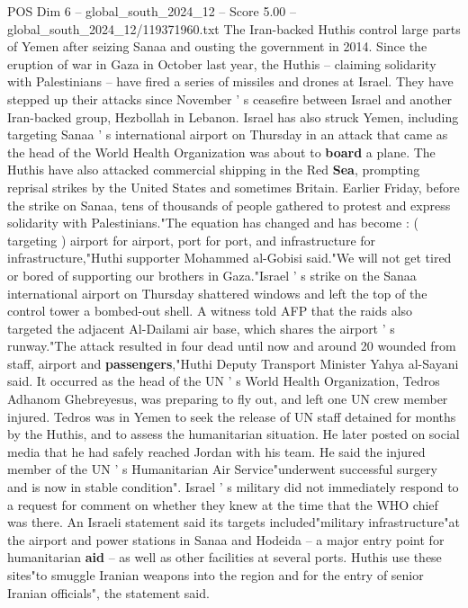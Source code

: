 \begin{textsample}{POS Dim 6 – global\_south\_2024\_12 – Score 5.00 – global\_south\_2024\_12/119371960.txt}  \label{ex:f6_pos_321}
The Iran-backed Huthis control large parts of Yemen after seizing Sanaa and ousting the government in 2014.
Since the eruption of war in Gaza in October last year, the Huthis -- claiming solidarity with Palestinians -- have fired a series of missiles and drones at Israel.
They have stepped up their attacks since November ' s ceasefire between Israel and another Iran-backed group, Hezbollah in Lebanon.
Israel has also struck Yemen, including targeting Sanaa ' s international airport on Thursday in an attack that came as the head of the World Health Organization was about to \textbf{board} a plane.
The Huthis have also attacked commercial shipping in the Red \textbf{Sea}, prompting reprisal strikes by the United States and sometimes Britain.
Earlier Friday, before the strike on Sanaa, tens of thousands of people gathered to protest and express solidarity with Palestinians."The equation has changed and has become : ( targeting ) airport for airport, port for port, and infrastructure for infrastructure,"Huthi supporter Mohammed al-Gobisi said."We will not get tired or bored of supporting our brothers in Gaza."Israel ' s strike on the Sanaa international airport on Thursday shattered windows and left the top of the control tower a bombed-out shell.
A witness told AFP that the raids also targeted the adjacent Al-Dailami air base, which shares the airport ' s runway."The attack resulted in four dead until now and around 20 wounded from staff, airport and \textbf{passengers},"Huthi Deputy Transport Minister Yahya al-Sayani said.
It occurred as the head of the UN ' s World Health Organization, Tedros Adhanom Ghebreyesus, was preparing to fly out, and left one UN crew member injured.
Tedros was in Yemen to seek the release of UN staff detained for months by the Huthis, and to assess the humanitarian situation.
He later posted on social media that he had safely reached Jordan with his team.
He said the injured member of the UN ' s Humanitarian Air Service"underwent successful surgery and is now in stable condition".
Israel ' s military did not immediately respond to a request for comment on whether they knew at the time that the WHO chief was there.
An Israeli statement said its targets included"military infrastructure"at the airport and power stations in Sanaa and Hodeida -- a major entry point for humanitarian \textbf{aid} -- as well as other facilities at several ports.
Huthis use these sites"to smuggle Iranian weapons into the region and for the entry of senior Iranian officials", the statement said.

\end{textsample}
